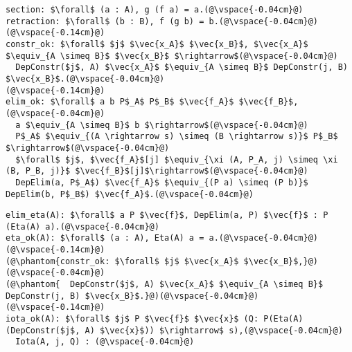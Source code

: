 \begin{figure*}
\begin{minipage}{0.43\textwidth}
\begin{lstlisting}
section: $\forall$ (a : A), g (f a) = a.(@\vspace{-0.04cm}@)
retraction: $\forall$ (b : B), f (g b) = b.(@\vspace{-0.04cm}@)
(@\vspace{-0.14cm}@)
constr_ok: $\forall$ $j$ $\vec{x_A}$ $\vec{x_B}$, $\vec{x_A}$ $\equiv_{A \simeq B}$ $\vec{x_B}$ $\rightarrow$(@\vspace{-0.04cm}@)
  DepConstr($j$, A) $\vec{x_A}$ $\equiv_{A \simeq B}$ DepConstr(j, B) $\vec{x_B}$.(@\vspace{-0.04cm}@)
(@\vspace{-0.14cm}@)
elim_ok: $\forall$ a b P$_A$ P$_B$ $\vec{f_A}$ $\vec{f_B}$,(@\vspace{-0.04cm}@)
  a $\equiv_{A \simeq B}$ b $\rightarrow$(@\vspace{-0.04cm}@)
  P$_A$ $\equiv_{(A \rightarrow s) \simeq (B \rightarrow s)}$ P$_B$ $\rightarrow$(@\vspace{-0.04cm}@)
  $\forall$ $j$, $\vec{f_A}$[j] $\equiv_{\xi (A, P_A, j) \simeq \xi (B, P_B, j)}$ $\vec{f_B}$[j]$\rightarrow$(@\vspace{-0.04cm}@)
  DepElim(a, P$_A$) $\vec{f_A}$ $\equiv_{(P a) \simeq (P b)}$ DepElim(b, P$_B$) $\vec{f_A}$.(@\vspace{-0.04cm}@)
\end{lstlisting}
\end{minipage}
\hfill
\begin{minipage}{0.56\textwidth}
\begin{lstlisting}
elim_eta(A): $\forall$ a P $\vec{f}$, DepElim(a, P) $\vec{f}$ : P (Eta(A) a).(@\vspace{-0.04cm}@)
eta_ok(A): $\forall$ (a : A), Eta(A) a = a.(@\vspace{-0.04cm}@)
(@\vspace{-0.14cm}@)
(@\phantom{constr_ok: $\forall$ $j$ $\vec{x_A}$ $\vec{x_B}$,}@)(@\vspace{-0.04cm}@)
(@\phantom{  DepConstr($j$, A) $\vec{x_A}$ $\equiv_{A \simeq B}$ DepConstr(j, B) $\vec{x_B}$.}@)(@\vspace{-0.04cm}@)
(@\vspace{-0.14cm}@)
iota_ok(A): $\forall$ $j$ P $\vec{f}$ $\vec{x}$ (Q: P(Eta(A) (DepConstr($j$, A) $\vec{x}$)) $\rightarrow$ s),(@\vspace{-0.04cm}@)
  Iota(A, j, Q) : (@\vspace{-0.04cm}@)

\end{lstlisting}
\end{minipage}
\end{figure*}
